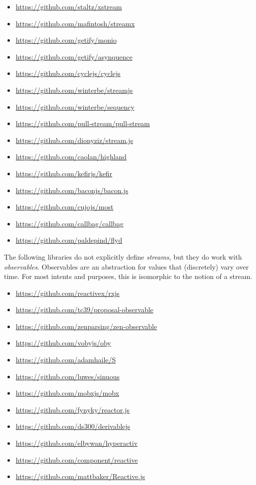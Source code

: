 \documentclass[sigplan,screen,10pt,review]{acmart}
\begin{document}
\begin{itemize}
    \item \url{https://github.com/staltz/xstream}
    \item \url{https://github.com/mafintosh/streamx}
    \item \url{https://github.com/getify/monio}
    \item \url{https://github.com/getify/asynquence}
    \item \url{https://github.com/cyclejs/cyclejs}
    \item \url{https://github.com/winterbe/streamjs}
    \item \url{https://github.com/winterbe/sequency}
    \item \url{https://github.com/pull-stream/pull-stream}
    \item \url{https://github.com/dionyziz/stream.js}
    \item \url{https://github.com/caolan/highland}
    \item \url{https://github.com/kefirjs/kefir}
    \item \url{https://github.com/baconjs/bacon.js}
    \item \url{https://github.com/cujojs/most}
    \item \url{https://github.com/callbag/callbag}
    \item \url{https://github.com/paldepind/flyd}
\end{itemize}
    
The following libraries do not explicitly define \textit{streams}, but they do work with \textit{observables}. Observables are an abstraction for values that (discretely) vary over time. For most intents and purposes, this is isomorphic to the notion of a stream.

\begin{itemize}
    \item \url{https://github.com/reactivex/rxjs}
    \item \url{https://github.com/tc39/proposal-observable}
    \item \url{https://github.com/zenparsing/zen-observable}
    \item \url{https://github.com/vobyjs/oby}
    \item \url{https://github.com/adamhaile/S}
    \item \url{https://github.com/luwes/sinuous}
    \item \url{https://github.com/mobxjs/mobx}
    \item \url{https://github.com/fynyky/reactor.js}
    \item \url{https://github.com/ds300/derivablejs}
    \item \url{https://github.com/elbywan/hyperactiv}
    \item \url{https://github.com/component/reactive}
    \item \url{https://github.com/mattbaker/Reactive.js}
\end{itemize}
\end{document}
